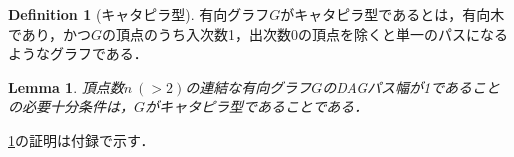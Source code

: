 \documentclass[master]{kuisthesis}		%
\theoremstyle{plain}
\newtheorem{lemma}{Lemma}
\theoremstyle{definition}
\newtheorem{definition*}{Definition}
\begin{document}
\begin{definition*}[キャタピラ型]
    有向グラフ$G$がキャタピラ型であるとは，有向木であり，かつ$G$の頂点のうち入次数1，出次数0の頂点を除くと単一のパスになるようなグラフである．
\end{definition*}


\begin{lemma}\label{catapillar}
    頂点数$n\ (>2)$の連結な有向グラフ$G$のDAGパス幅が1であることの必要十分条件は，$G$がキャタピラ型であることである．
\end{lemma}

\ref{catapillar}の証明は付録で示す．

\end{document}
